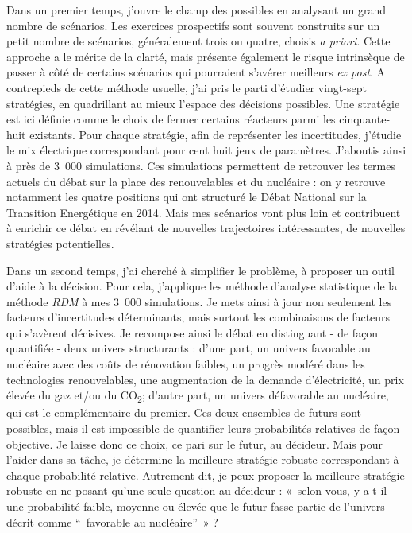 Dans un premier temps, j'ouvre le champ des possibles en analysant un grand nombre de scénarios. Les exercices prospectifs sont souvent construits sur un petit nombre de scénarios, généralement trois ou quatre, choisis \textit{a priori}. Cette approche a le mérite de la clarté, mais présente également le risque intrinsèque de passer à côté de certains scénarios qui pourraient s'avérer meilleurs \textit{ex post}.
A contrepieds de cette méthode usuelle, j'ai pris le parti d'étudier vingt-sept stratégies, en quadrillant au mieux l'espace des décisions possibles. Une stratégie est ici définie comme le choix de fermer certains réacteurs parmi les cinquante-huit existants. Pour chaque stratégie, afin de représenter les incertitudes, j'étudie le mix électrique correspondant pour cent huit jeux de paramètres. J'aboutis ainsi à près de 3~000 simulations.
Ces simulations permettent de retrouver les termes actuels du débat sur la place des renouvelables et du nucléaire : on y retrouve notamment les quatre positions qui ont structuré le Débat National sur la Transition Energétique en 2014. Mais mes scénarios vont plus loin et contribuent à enrichir ce débat en révélant de nouvelles trajectoires intéressantes, de nouvelles stratégies potentielles. 

Dans un second temps, j'ai cherché à simplifier le problème, à proposer un outil d'aide à la décision. 
Pour cela, j'applique les méthode d'analyse statistique de la méthode \textit{RDM} à mes 3~000 simulations. Je mets ainsi à jour non seulement les facteurs d'incertitudes déterminants, mais surtout les combinaisons de facteurs qui s'avèrent décisives.
Je recompose ainsi le débat en distinguant - de façon quantifiée - deux univers structurants : d'une part, un univers favorable au nucléaire avec des coûts de rénovation faibles, un progrès modéré dans les technologies renouvelables, une augmentation de la demande d'électricité, un prix élevée du gaz et/ou du CO\textsubscript{2}; d'autre part, un univers défavorable au nucléaire, qui est le complémentaire du premier.
Ces deux ensembles de futurs sont possibles, mais il est impossible de quantifier leurs probabilités relatives de façon objective. Je laisse donc ce choix, ce pari sur le futur, au décideur. 
Mais pour l'aider dans sa tâche, je détermine la meilleure stratégie robuste correspondant à chaque probabilité relative. Autrement dit, je peux proposer la meilleure stratégie robuste en ne posant qu'une seule question au décideur : «~selon vous, y a-t-il une probabilité faible, moyenne ou élevée que le futur fasse partie de l'univers décrit comme “~favorable au nucléaire”~» ?
 
